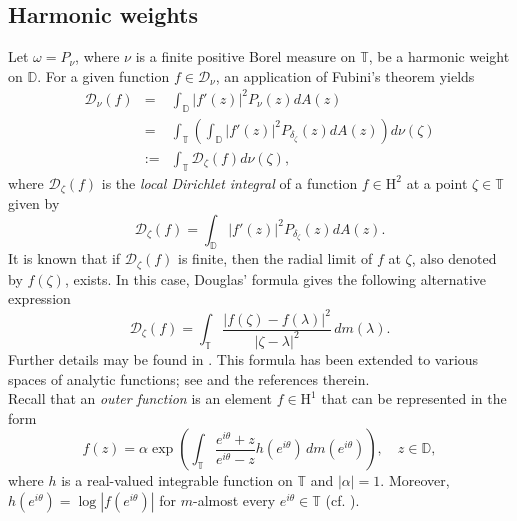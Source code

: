 \documentclass[12pt,reqno,a4paper]{amsart}
\newcommand{\hH}{\mathrm{H^2 }}
\newcommand\TT{\mathbb{T}}
\newcommand\DD{\mathbb{D}}
\newcommand{\cD}{{\mathcal{D}}}
\numberwithin{equation}{section}
\begin{document}
\subsection{Harmonic weights} Let $\omega = P_\nu$, where $\nu$ is a
finite positive Borel measure on $\TT$, be a harmonic weight on $\DD$. For a given function $f \in \cD_\nu$, an application of Fubini's theorem yields 
\[
\begin{array}{lll}
	\cD_\nu (f)& =& \displaystyle \int_\DD|f'(z)|^2P_\nu(z)dA(z)\\
	& = &\displaystyle \int_\TT  \left ( \displaystyle \int_\DD|f'(z)|^2P_{\delta_\zeta}(z)dA(z)\right )d\nu(\zeta)\\
	& := & \displaystyle \int_\TT \cD_\zeta (f)d\nu(\zeta),
\end{array}
\]
where $\cD_\zeta(f)$ is the \textit{local Dirichlet integral} of a function \( f \in \hH \) at a point \(\zeta \in \mathbb{T}\) given by 
$$
\cD_\zeta (f)= \displaystyle \int_\DD|f'(z)|^2P_{\delta_\zeta}(z)dA(z).
$$
It is known that if $\cD_\zeta (f)$ is finite, then the radial limit of $f$ at $\zeta$, also denoted by $f(\zeta)$, exists. In this case, Douglas' formula gives the following alternative expression
\[
\cD_{\zeta}(f) = \int_{\mathbb{T}} \frac{|f(\zeta) - f(\lambda)|^2}{|\zeta - \lambda|^2} \, dm(\lambda).
\]
Further details may be found in \cite{EKMR14}. This formula has been extended to various spaces of analytic functions; see \cite{BE25} and the references therein.\\
Recall that an \textit{outer function} is an element \( f \in \mathrm{H}^1 \) that can be represented in the form
\[
f(z) = \alpha \exp\left( \int_{\mathbb{T}} \frac{e^{i\theta} + z}{e^{i\theta} - z} h(e^{i\theta}) \, dm(e^{i\theta}) \right), \quad z \in \mathbb{D},
\]
where \( h \) is a real-valued integrable function on $\TT$ and \( |\alpha| = 1 \). Moreover, \( h(e^{i\theta}) = \log |f(e^{i\theta})| \) for \( m \)-almost every \( e^{i\theta} \in \TT\) (cf. \cite{Koo}).\\ 
\end{document}
